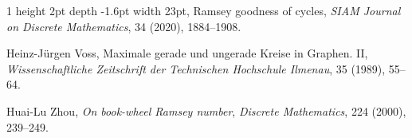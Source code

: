 \documentclass[reqno,10pt]{amsart}
\theoremstyle{definition}
\begin{document}
\begin{thebibliography}{1}
\leavevmode\vrule height 2pt depth -1.6pt width 23pt, Ramsey goodness of cycles, \emph{SIAM Journal on Discrete Mathematics}, 34 (2020), 1884--1908.

{\sc Heinz-J\"{u}rgen Voss}, Maximale gerade und ungerade {K}reise in {G}raphen. {II}, \emph{Wissenschaftliche Zeitschrift der Technischen Hochschule Ilmenau}, 35 (1989), 55--64.

{\sc Huai-Lu Zhou}, {\em On book-wheel Ramsey number}, \emph{Discrete Mathematics}, 224 (2000), 239--249.

\end{thebibliography}
\end{document}
